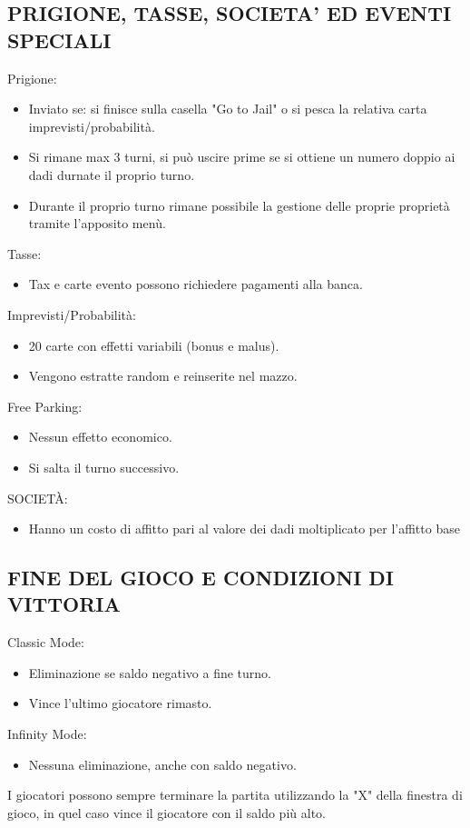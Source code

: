 \subsection{PRIGIONE, TASSE, SOCIETA' ED EVENTI SPECIALI}
Prigione:\newline
\begin{itemize}
    \item Inviato se: si finisce sulla casella "Go to Jail" o si pesca la relativa carta imprevisti/probabilità.
    \item Si rimane max 3 turni, si può uscire prime se si ottiene un numero doppio ai dadi durnate il proprio turno.
    \item Durante il proprio turno rimane possibile la gestione delle proprie proprietà tramite l'apposito menù.
\end{itemize}
Tasse:\newline
\begin{itemize}
    \item Tax e carte evento possono richiedere pagamenti alla banca.
\end{itemize}
Imprevisti/Probabilità:\newline
\begin{itemize}
    \item 20 carte con effetti variabili (bonus e malus).
    \item Vengono estratte random e reinserite nel mazzo.
\end{itemize}
Free Parking:\newline
\begin{itemize}
    \item Nessun effetto economico.
    \item Si salta il turno successivo.
\end{itemize}
SOCIETÀ:
\begin{itemize}
    \item Hanno un costo di affitto pari al valore dei dadi moltiplicato per l'affitto base
\end{itemize}
\subsection{FINE DEL GIOCO E CONDIZIONI DI VITTORIA}
Classic Mode:\newline
\begin{itemize}
    \item Eliminazione se saldo negativo a fine turno.
    \item Vince l’ultimo giocatore rimasto.
\end{itemize}
Infinity Mode:\newline
\begin{itemize}
    \item Nessuna eliminazione, anche con saldo negativo.
\end{itemize}
I giocatori possono sempre terminare la partita utilizzando la "X" della finestra di gioco, in quel caso vince il giocatore con il saldo più alto.
